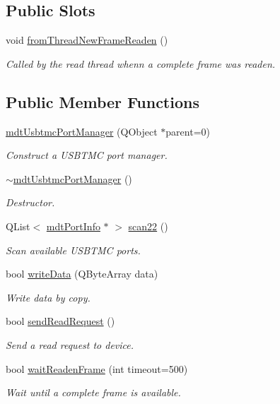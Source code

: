 \subsection*{Public Slots}
\begin{DoxyCompactItemize}
\item 
void \hyperlink{classmdt_usbtmc_port_manager_aca42b343ae1f6a324e6e45968f03bbea}{fromThreadNewFrameReaden} ()
\begin{DoxyCompactList}\small\item\em Called by the read thread whenn a complete frame was readen. \end{DoxyCompactList}\end{DoxyCompactItemize}
\subsection*{Public Member Functions}
\begin{DoxyCompactItemize}
\item 
\hyperlink{classmdt_usbtmc_port_manager_a99a24e4360e70ffc63677dbe888513f7}{mdtUsbtmcPortManager} (QObject $\ast$parent=0)
\begin{DoxyCompactList}\small\item\em Construct a USBTMC port manager. \end{DoxyCompactList}\item 
\hyperlink{classmdt_usbtmc_port_manager_aad6b2eef9b5cfb5c324affb6962a463b}{$\sim$mdtUsbtmcPortManager} ()
\begin{DoxyCompactList}\small\item\em Destructor. \end{DoxyCompactList}\item 
QList$<$ \hyperlink{classmdt_port_info}{mdtPortInfo} $\ast$ $>$ \hyperlink{classmdt_usbtmc_port_manager_a41d46a7104601f0259c772328c743b75}{scan22} ()
\begin{DoxyCompactList}\small\item\em Scan available USBTMC ports. \end{DoxyCompactList}\item 
bool \hyperlink{classmdt_usbtmc_port_manager_a7ff9a9ada7919af9a90286859695a29d}{writeData} (QByteArray data)
\begin{DoxyCompactList}\small\item\em Write data by copy. \end{DoxyCompactList}\item 
bool \hyperlink{classmdt_usbtmc_port_manager_a2da27dcbfc9448f1d61d93679b9a2ef3}{sendReadRequest} ()
\begin{DoxyCompactList}\small\item\em Send a read request to device. \end{DoxyCompactList}\item 
bool \hyperlink{classmdt_usbtmc_port_manager_a78ec9aec17061657f2151c677fc869eb}{waitReadenFrame} (int timeout=500)
\begin{DoxyCompactList}\small\item\em Wait until a complete frame is available. \end{DoxyCompactList}\end{DoxyCompactItemize}


